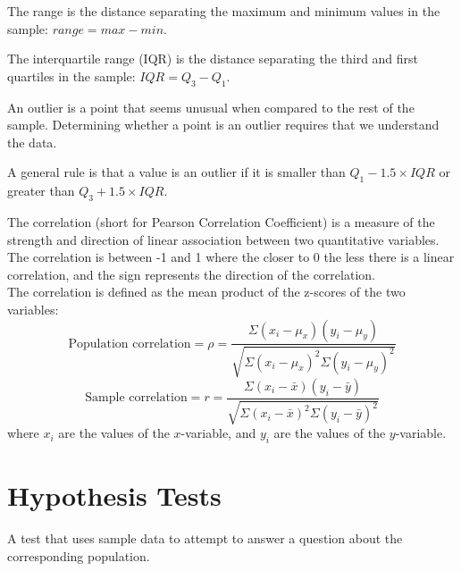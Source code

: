 \documentclass[12pt]{article}
\begin{document}
\begin{tcolorbox}[title=Range]
    The range is the distance separating the maximum and minimum values in the sample: $range = max - min$.
\end{tcolorbox}

\begin{tcolorbox}[title=Interquartile Range]
    The interquartile range (IQR) is the distance separating the third and first quartiles in the sample: $IQR = Q_3 - Q_1.$
\end{tcolorbox}

\begin{tcolorbox}[title=Outliers]
    An outlier is a point that seems unusual when compared to the rest of the sample. Determining whether a point is an outlier requires that we understand the data.
    \begin{tcolorbox}[title=Outlier General Rule]
        A general rule is that a value is an outlier if it is smaller than $Q_1 - 1.5 \times IQR$ or greater than $Q_3 + 1.5 \times IQR$.
    \end{tcolorbox}
\end{tcolorbox}

\begin{tcolorbox}[title=Correlation]
    The correlation (short for Pearson Correlation Coefficient) is a measure of the strength and direction of linear association between two quantitative variables. The correlation is between -1 and 1 where the closer to 0 the less there is a linear correlation, and the sign represents the direction of the correlation.\\
    The correlation is defined as the mean product of the z-scores of the two variables:
    \[\text{Population correlation} = \rho = \frac{\Sigma(x_i-\mu_{x})(y_i-\mu_{y})}{\sqrt{\Sigma(x_i-\mu_{x})^2\Sigma(y_i-\mu_{y})^2}}\]
    \[\text{Sample correlation} = r = \frac{\Sigma(x_i-\bar{x})(y_i-\bar{y})}{\sqrt{\Sigma(x_i-\bar{x})^2\Sigma(y_i-\bar{y})^2}}\]
    where $x_i$ are the values of the $x$-variable, and $y_i$ are the values of the $y$-variable.
\end{tcolorbox}

\pagebreak
\section{Hypothesis Tests}
\begin{tcolorbox}[title=Statistical Test]
    A test that uses sample data to attempt to answer a question about the corresponding population.
\end{tcolorbox}
\end{document}
